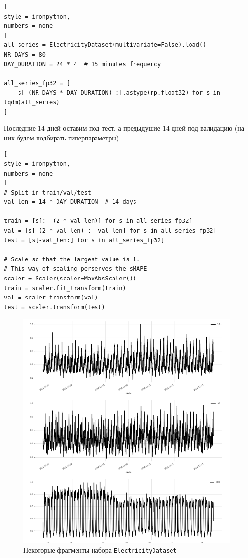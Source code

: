 \documentclass[%
	11pt,
	a4paper,
	utf8,
		]{article}
\begin{document}
\begin{lstlisting}[
style = ironpython,
numbers = none	
]
all_series = ElectricityDataset(multivariate=False).load()
NR_DAYS = 80
DAY_DURATION = 24 * 4  # 15 minutes frequency

all_series_fp32 = [
	s[-(NR_DAYS * DAY_DURATION) :].astype(np.float32) for s in tqdm(all_series)
]
\end{lstlisting}

Последние 14 дней оставим под тест, а предыдущие 14 дней под валидацию (на них будем подбирать гиперпараметры)
\begin{lstlisting}[
style = ironpython,
numbers = none
]
# Split in train/val/test
val_len = 14 * DAY_DURATION  # 14 days

train = [s[: -(2 * val_len)] for s in all_series_fp32]
val = [s[-(2 * val_len) : -val_len] for s in all_series_fp32]
test = [s[-val_len:] for s in all_series_fp32]

# Scale so that the largest value is 1.
# This way of scaling perserves the sMAPE
scaler = Scaler(scaler=MaxAbsScaler())
train = scaler.fit_transform(train)
val = scaler.transform(val)
test = scaler.transform(test)
\end{lstlisting}

\begin{figure}[h]
	\centering
	\includegraphics[scale=1.2 ]{figures/electricity_dataset.png}
	\caption{ Некоторые фрагменты набора \texttt{ElectricityDataset} }\label{fig:electricity_dataset}
\end{figure}
\end{document}
